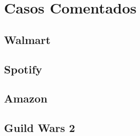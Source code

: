 \chapter{Casos Comentados}
\label{cap2}

\section{Walmart}

\section{Spotify}

\section{Amazon}

\section{Guild Wars 2}

